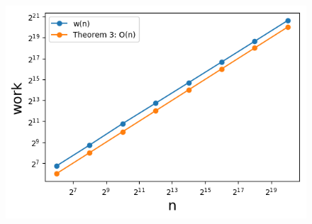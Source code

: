 \begin{figure}[H]
	\hspace*{-1.1cm}
    \begin{minipage}[t]{.30\textwidth}
        \centering
    \end{minipage}
    \hspace*{.8cm}
    \begin{minipage}[t]{.30\textwidth}
        \centering
        \includegraphics[width=1.2\textwidth]{pictures/min_theo4_2_work.png}
    \end{minipage}
    \hspace*{.8cm}

\end{figure}
